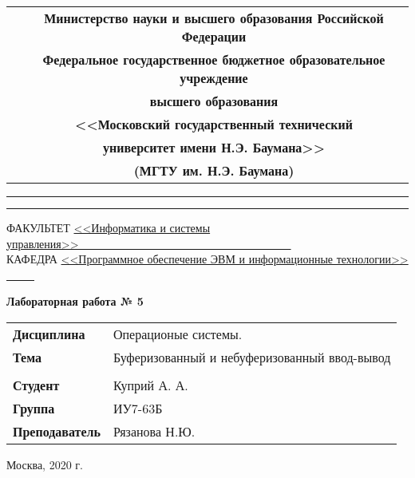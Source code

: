 \pagestyle{empty}
    \begin{table}[H]
        \centering
        \footnotesize
        \begin{tabular}{cc}
            & \textbf{Министерство науки и высшего образования Российской Федерации} \\
            & \textbf{Федеральное государственное бюджетное образовательное учреждение} \\
            & \textbf{высшего образования} \\
            & \textbf{<<Московский государственный технический} \\
            & \textbf{университет имени Н.Э. Баумана>>} \\
            & \textbf{(МГТУ им. Н.Э. Баумана)} \\
        \end{tabular}
    \end{table}

    \vspace{-2.5cm}

    \begin{flushleft}
        \rule[-1cm]{\textwidth}{3pt}
        \rule{\textwidth}{1pt}
    \end{flushleft}

    \begin{flushleft}
        \small
        ФАКУЛЬТЕТ
        \underline{<<Информатика и системы управления>>\ \ \ \ \ \ \ 
        \ \ \ \ \ \ \ \ \ \ \ \ \ \ \ \ \ \ \ \ \ \ \ \ \ \ \ \ \ \ \  } \\
        КАФЕДРА
        \underline{<<Программное обеспечение ЭВМ и
        информационные технологии>>
        \ \ \ \ \ }
    \end{flushleft}

    \vspace{1cm}

    \begin{center}
        \textbf{Лабораторная работа № 5} \\
        \vspace{0.5cm}
    \end{center}

    \vspace{4cm}

    \begin{flushleft}
        \begin{tabular}{ll}
            \textbf{Дисциплина} & Операционые системы. \\
            \textbf{Тема} & Буферизованный и небуферизованный ввод-вывод \\
            \\
            \textbf{Студент} & Куприй А. А. \\
            \textbf{Группа} & ИУ7-63Б \\
            \textbf{Преподаватель} & Рязанова Н.Ю. \\
        \end{tabular}
    \end{flushleft}

    \vspace{6cm}

    \begin{center}
        Москва, 2020 г.
    \end{center}
